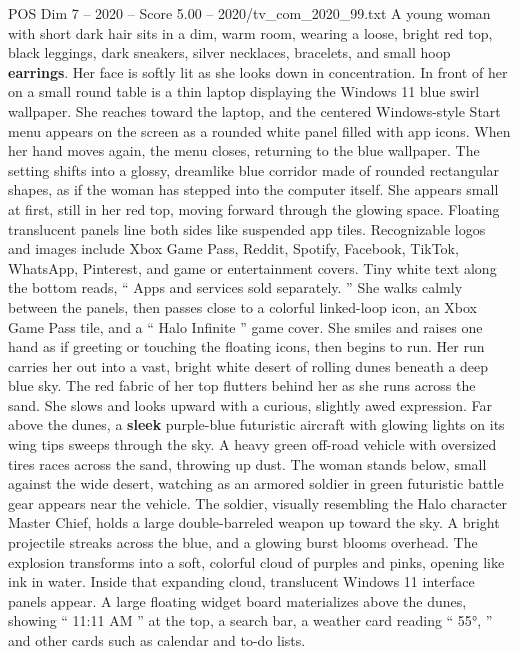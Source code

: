 \begin{textsample}{POS Dim 7 – 2020 – Score 5.00 – 2020/tv\_com\_2020\_99.txt}  \label{ex:f7_pos_087}
A young woman with short dark hair sits in a dim, warm room, wearing a loose, bright red top, black leggings, dark sneakers, silver necklaces, bracelets, and small hoop \textbf{earrings}.
Her face is softly lit as she looks down in concentration.
In front of her on a small round table is a thin laptop displaying the Windows 11 blue swirl wallpaper.
She reaches toward the laptop, and the centered Windows-style Start menu appears on the screen as a rounded white panel filled with app icons.
When her hand moves again, the menu closes, returning to the blue wallpaper.
The setting shifts into a glossy, dreamlike blue corridor made of rounded rectangular shapes, as if the woman has stepped into the computer itself.
She appears small at first, still in her red top, moving forward through the glowing space.
Floating translucent panels line both sides like suspended app tiles.
Recognizable logos and images include Xbox Game Pass, Reddit, Spotify, Facebook, TikTok, WhatsApp, Pinterest, and game or entertainment covers.
Tiny white text along the bottom reads, “ Apps and services sold separately. ” She walks calmly between the panels, then passes close to a colorful linked-loop icon, an Xbox Game Pass tile, and a “ Halo Infinite ” game cover.
She smiles and raises one hand as if greeting or touching the floating icons, then begins to run.
Her run carries her out into a vast, bright white desert of rolling dunes beneath a deep blue sky.
The red fabric of her top flutters behind her as she runs across the sand.
She slows and looks upward with a curious, slightly awed expression.
Far above the dunes, a \textbf{sleek} purple-blue futuristic aircraft with glowing lights on its wing tips sweeps through the sky.
A heavy green off-road vehicle with oversized tires races across the sand, throwing up dust.
The woman stands below, small against the wide desert, watching as an armored soldier in green futuristic battle gear appears near the vehicle.
The soldier, visually resembling the Halo character Master Chief, holds a large double-barreled weapon up toward the sky.
A bright projectile streaks across the blue, and a glowing burst blooms overhead.
The explosion transforms into a soft, colorful cloud of purples and pinks, opening like ink in water.
Inside that expanding cloud, translucent Windows 11 interface panels appear.
A large floating widget board materializes above the dunes, showing “ 11:11 AM ” at the top, a search bar, a weather card reading “ 55{\EmojiFont °}, ” and other cards such as calendar and to-do lists.

\end{textsample}
